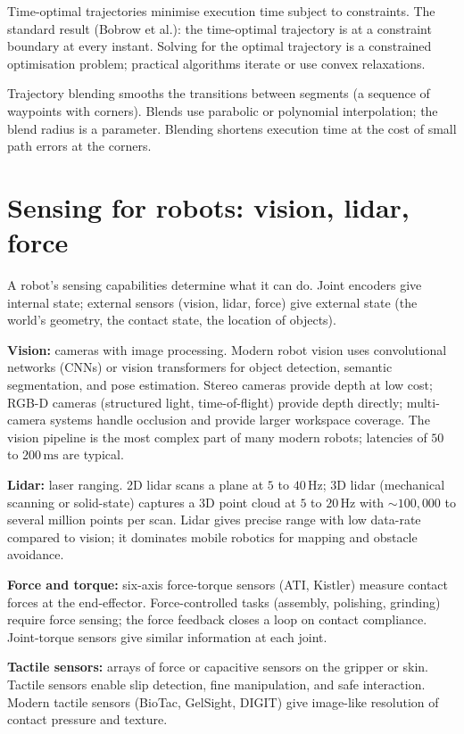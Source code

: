 Time-optimal trajectories minimise execution time subject to constraints. The standard result (Bobrow et al.): the time-optimal trajectory is at a constraint boundary at every instant. Solving for the optimal trajectory is a constrained optimisation problem; practical algorithms iterate or use convex relaxations.

Trajectory blending smooths the transitions between segments (a sequence of waypoints with corners). Blends use parabolic or polynomial interpolation; the blend radius is a parameter. Blending shortens execution time at the cost of small path errors at the corners.

\section{Sensing for robots: vision, lidar, force}

A robot's sensing capabilities determine what it can do. Joint encoders give internal state; external sensors (vision, lidar, force) give external state (the world's geometry, the contact state, the location of objects).

\textbf{Vision:} cameras with image processing. Modern robot vision uses convolutional networks (CNNs) or vision transformers for object detection, semantic segmentation, and pose estimation. Stereo cameras provide depth at low cost; RGB-D cameras (structured light, time-of-flight) provide depth directly; multi-camera systems handle occlusion and provide larger workspace coverage. The vision pipeline is the most complex part of many modern robots; latencies of $50$ to $200\,\text{ms}$ are typical.

\textbf{Lidar:} laser ranging. 2D lidar scans a plane at $5$ to $40\,\text{Hz}$; 3D lidar (mechanical scanning or solid-state) captures a 3D point cloud at $5$ to $20\,\text{Hz}$ with $\sim 100{,}000$ to several million points per scan. Lidar gives precise range with low data-rate compared to vision; it dominates mobile robotics for mapping and obstacle avoidance.

\textbf{Force and torque:} six-axis force-torque sensors (ATI, Kistler) measure contact forces at the end-effector. Force-controlled tasks (assembly, polishing, grinding) require force sensing; the force feedback closes a loop on contact compliance. Joint-torque sensors give similar information at each joint.

\textbf{Tactile sensors:} arrays of force or capacitive sensors on the gripper or skin. Tactile sensors enable slip detection, fine manipulation, and safe interaction. Modern tactile sensors (BioTac, GelSight, DIGIT) give image-like resolution of contact pressure and texture.

